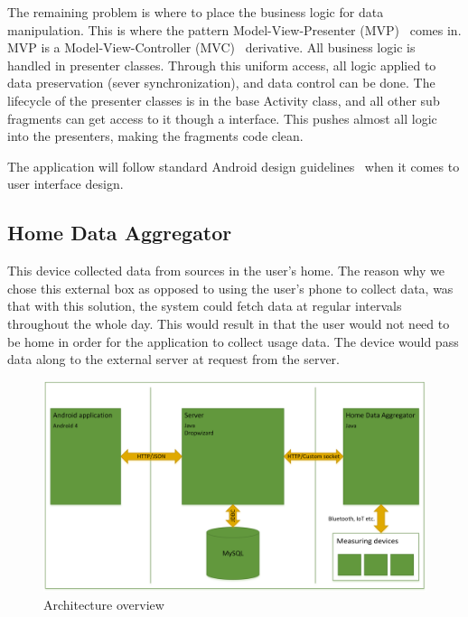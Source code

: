 The remaining problem is where to place the business logic for data manipulation. This is where the pattern Model-View-Presenter (MVP)~\cite{mvp} comes in. MVP is a Model-View-Controller (MVC)~\cite{mvc} derivative. All business logic is handled in presenter classes. Through this uniform access, all logic applied to data preservation (sever synchronization), and data control can be done. The lifecycle of the presenter classes is in the base Activity class, and all other sub fragments can get access to it though a interface. This pushes almost all logic into the presenters, making the fragments code clean.

The application will follow standard Android design guidelines~\cite{Androidgui}
when it comes to user interface design.

\subsection{Home Data Aggregator}
This device collected data from sources in the user's home. The reason why we chose this external box as opposed to using the user's phone to collect data, was that with this solution, the system could fetch data at regular intervals throughout the whole day. This would result in that the user would not need to be home in order for the application to collect 
usage data. The device would pass data along to the external server at request from the server.

\begin{figure}[H]
\includegraphics[width=\textwidth]{ch/architecture/fig/architecture.png}
\caption{Architecture overview}
\end{figure}
